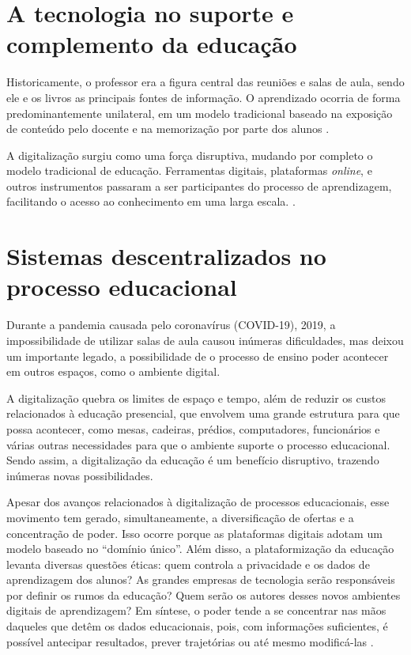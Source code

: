 \section{A tecnologia no suporte e complemento da educação}
Historicamente, o professor era a figura central das reuniões e salas de aula, sendo ele e os livros as principais fontes de informação. O aprendizado ocorria de forma predominantemente unilateral, em um modelo tradicional baseado na exposição de conteúdo pelo docente e na memorização por parte dos alunos \cite{unicep2024}.

A digitalização surgiu como uma força disruptiva, mudando por completo o modelo tradicional de educação. Ferramentas digitais, plataformas \textit{online}, e outros instrumentos passaram a ser participantes do processo de aprendizagem, facilitando o acesso ao conhecimento em uma larga escala. \cite{unicep2024}.

\section{Sistemas descentralizados no processo educacional}
Durante a pandemia causada pelo coronavírus (COVID-19), 2019, a impossibilidade de utilizar salas de aula causou inúmeras dificuldades, mas deixou um importante legado, a possibilidade de o processo de ensino poder acontecer em outros espaços, como o ambiente digital.

A digitalização quebra os limites de espaço e tempo, além de reduzir os custos relacionados à educação presencial, que envolvem uma grande estrutura para que possa acontecer, como mesas, cadeiras, prédios, computadores, funcionários e várias outras necessidades para que o ambiente suporte o processo educacional. Sendo assim, a digitalização da educação é um benefício disruptivo, trazendo inúmeras novas possibilidades.

Apesar dos avanços relacionados à digitalização de processos educacionais, esse movimento tem gerado, simultaneamente, a diversificação de ofertas e a concentração de poder. Isso ocorre porque as plataformas digitais adotam um modelo baseado no “domínio único”. Além disso, a plataformização da educação levanta diversas questões éticas: quem controla a privacidade e os dados de aprendizagem dos alunos? As grandes empresas de tecnologia serão responsáveis por definir os rumos da educação? Quem serão os autores desses novos ambientes digitais de aprendizagem? Em síntese, o poder tende a se concentrar nas mãos daqueles que detêm os dados educacionais, pois, com informações suficientes, é possível antecipar resultados, prever trajetórias ou até mesmo modificá-las \cite{valente2022}.

